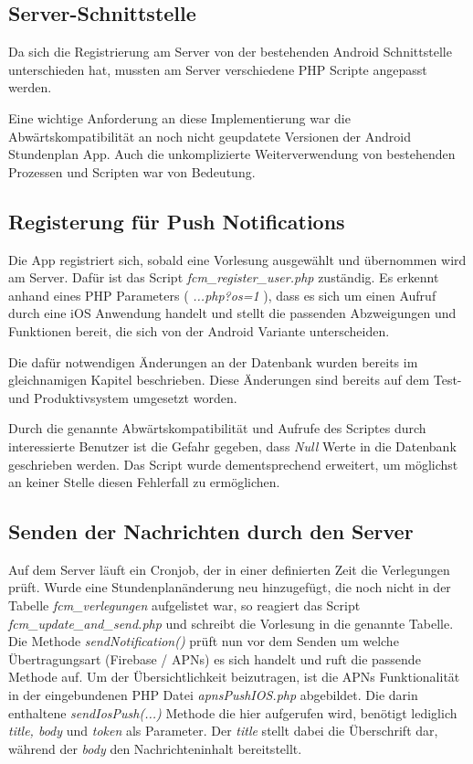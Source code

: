 \subsection{Server-Schnittstelle}
Da sich die Registrierung am Server von der bestehenden Android Schnittstelle unterschieden hat, mussten am Server verschiedene PHP Scripte angepasst werden.

Eine wichtige Anforderung an diese Implementierung war die Abwärtskompatibilität an noch nicht geupdatete Versionen der Android Stundenplan App. Auch die unkomplizierte Weiterverwendung von bestehenden Prozessen und Scripten war von Bedeutung.

\newpage


\subsection{Registerung für Push Notifications}
Die App registriert sich, sobald eine Vorlesung ausgewählt und übernommen wird am Server. Dafür ist das Script \textit{fcm\_register\_user.php} zuständig. Es erkennt anhand eines PHP Parameters ( \textit{...php?os=1 }), dass es sich um einen Aufruf durch eine iOS Anwendung handelt und stellt die passenden Abzweigungen und Funktionen bereit, die sich von der Android Variante unterscheiden.

Die dafür notwendigen Änderungen an der Datenbank wurden bereits im gleichnamigen Kapitel beschrieben. Diese Änderungen sind bereits auf dem Test- und Produktivsystem umgesetzt worden.

Durch die genannte Abwärtskompatibilität und Aufrufe des Scriptes durch interessierte Benutzer ist die Gefahr gegeben, dass \textit{Null} Werte in die Datenbank geschrieben werden. Das Script wurde dementsprechend erweitert, um möglichst an keiner Stelle diesen Fehlerfall zu ermöglichen.

\subsection{Senden der Nachrichten durch den Server}
Auf dem Server läuft ein Cronjob, der in einer definierten Zeit die Verlegungen prüft. Wurde eine Stundenplanänderung neu hinzugefügt, die noch nicht in der Tabelle \textit{fcm\_verlegungen} aufgelistet war, so reagiert das Script \textit{fcm\_update\_and\_send.php} und schreibt die Vorlesung in die genannte Tabelle.\\
Die Methode \textit{sendNotification()} prüft nun vor dem Senden um welche Übertragungsart (Firebase / APNs) es sich handelt und ruft die passende Methode auf.
Um der Übersichtlichkeit beizutragen, ist die APNs Funktionalität in der eingebundenen PHP Datei \textit{apnsPushIOS.php} abgebildet. Die darin enthaltene \textit{sendIosPush(...)} Methode die hier aufgerufen wird, benötigt lediglich \textit{title, body} und \textit{token} als Parameter. Der \textit{title} stellt dabei die Überschrift dar, während der \textit{body} den Nachrichteninhalt bereitstellt.

